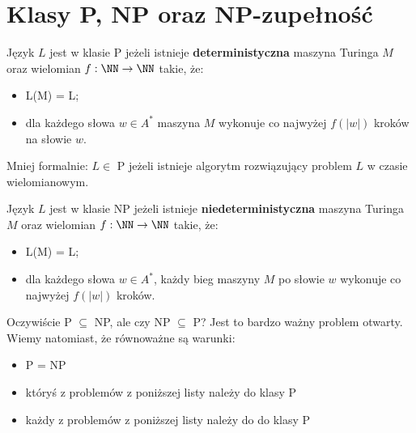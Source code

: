 \section{Klasy P, NP oraz NP-zupełność}
Język $L$ jest w klasie P jeżeli istnieje \textbf{deterministyczna} maszyna Turinga $M$ oraz wielomian $f: \NN \to \NN$ takie, że:
\begin{itemize}
    \item L(M) = L;
    \item dla każdego słowa $w \in A^*$ maszyna $M$ wykonuje co najwyżej $f(|w|)$ kroków na słowie $w$.
\end{itemize}
Mniej formalnie: $L \in$ P jeżeli istnieje algorytm rozwiązujący problem $L$ w czasie wielomianowym.

Język $L$ jest w klasie NP jeżeli istnieje \textbf{niedeterministyczna} maszyna Turinga $M$ oraz wielomian $f: \NN \to \NN$ takie, że:
\begin{itemize}
    \item L(M) = L;
    \item dla każdego słowa $w \in A^*$, każdy bieg maszyny $M$ po słowie $w$ wykonuje co najwyżej $f(|w|)$ kroków.
\end{itemize}

Oczywiście P $\subseteq$ NP, ale czy NP $\subseteq$ P? Jest to bardzo ważny problem otwarty. Wiemy natomiast, że równoważne są warunki:
\begin{itemize}
    \item P = NP
    \item któryś z problemów z poniższej listy należy do klasy P
    \item każdy z problemów z poniższej listy należy do do klasy P
\end{itemize}

